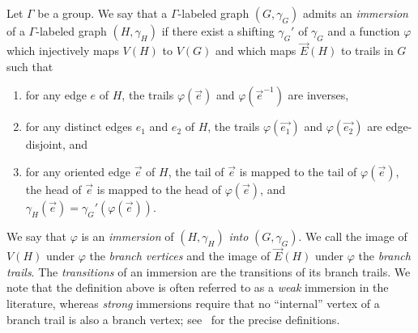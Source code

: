 \documentclass[11pt]{article}
\theoremstyle{definition}
\begin{document}
Let $\Gamma$ be a group. We say that a $\Gamma$-labeled graph $(G, \gamma_G)$ admits an \textit{immersion} of a $\Gamma$-labeled graph $(H, \gamma_H)$ if there exist a shifting $\gamma_G'$ of $\gamma_G$ and a function $\varphi$ which injectively maps $V(H)$ to $V(G)$ and which maps $\vec{E}(H)$ to trails in $G$ such that\begin{enumerate}
    \item for any edge $e$ of $H$, the trails $\varphi(\vec{e})$ and $\varphi(\vec{e}^{-1})$ are inverses,
    \item for any distinct edges $e_1$ and $e_2$ of $H$, the trails $\varphi(\vec{e_1})$ and $\varphi(\vec{e_2})$ are edge-disjoint, and
    \item for any oriented edge $\vec{e}$ of $H$, the tail of $\vec{e}$ is mapped to the tail of $\varphi(\vec{e})$, the head of $\vec{e}$ is mapped to the head of $\varphi(\vec{e})$, and $\gamma_H(\vec{e}) = \gamma_G'(\varphi(\vec{e}))$.
\end{enumerate} We say that $\varphi$ is an \emph{immersion} of $(H, \gamma_H)$ \emph{into} $(G, \gamma_G)$. We call the image of $V(H)$ under $\varphi$ the \textit{branch vertices} and the image of $\vec{E}(H)$ under $\varphi$ the \textit{branch trails}. The \textit{transitions} of an immersion are the transitions of its branch trails. We note that the definition above is often referred to as a \emph{weak} immersion in the literature, whereas \emph{strong} immersions require that no ``internal'' vertex of a branch trail is also a branch vertex; see~\cite{DvorakWollanStrong16, MarxWollanStrong14, WOLLAN2015} for the precise definitions.
\end{document}
